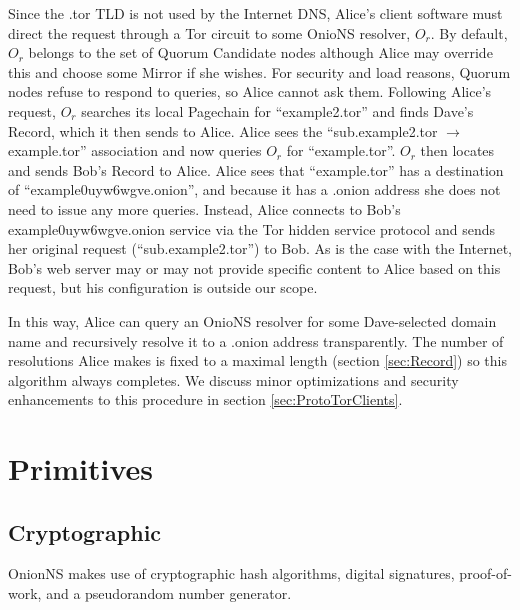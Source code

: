Since the .tor TLD is not used by the Internet DNS, Alice's client software must direct the request through a Tor circuit to some OnioNS resolver, $ O_{r} $. By default, $ O_{r} $ belongs to the set of Quorum Candidate nodes although Alice may override this and choose some Mirror if she wishes. For security and load reasons, Quorum nodes refuse to respond to queries, so Alice cannot ask them. Following Alice's request, $ O_{r} $ searches its local Pagechain for ``example2.tor'' and finds Dave's Record, which it then sends to Alice. Alice sees the ``sub.example2.tor $ \rightarrow $ example.tor'' association and now queries $ O_{r} $ for ``example.tor''. $ O_{r} $ then locates and sends Bob's Record to Alice. Alice sees that ``example.tor'' has a destination of ``example0uyw6wgve.onion'', and because it has a .onion address she does not need to issue any more queries. Instead, Alice connects to Bob's example0uyw6wgve.onion service via the Tor hidden service protocol and sends her original request (``sub.example2.tor'') to Bob. As is the case with the Internet, Bob's web server may or may not provide specific content to Alice based on this request, but his configuration is outside our scope.

In this way, Alice can query an OnioNS resolver for some Dave-selected domain name and recursively resolve it to a .onion address transparently. The number of resolutions Alice makes is fixed to a maximal length (section \ref{sec:Record}) so this algorithm always completes. We discuss minor optimizations and security enhancements to this procedure in section \ref{sec:ProtoTorClients}.

\section{Primitives}

\subsection{Cryptographic}
\label{sec:CryptoPrim}

OnionNS makes use of cryptographic hash algorithms, digital signatures, proof-of-work, and a pseudorandom number generator.


